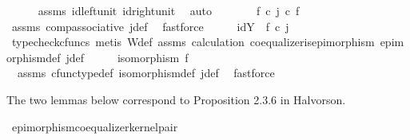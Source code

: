 \begin{isabellebody}
\ \ \ \ \isamarkupfalse%
\ assms{\isacharparenleft}{\kern0pt}{}{\isacharparenright}{\kern0pt}\ id{\isacharunderscore}{\kern0pt}left{\isacharunderscore}{\kern0pt}unit{}\ id{\isacharunderscore}{\kern0pt}right{\isacharunderscore}{\kern0pt}unit{}\ \isamarkupfalse%
\ auto\isanewline
\ \ \isamarkupfalse%
\ \isamarkupfalse%
\ {\isachardoublequoteopen}{\isachardot}{\kern0pt}{\isachardot}{\kern0pt}{\isachardot}{\kern0pt}\ {\isacharequal}{\kern0pt}\ {\isacharparenleft}{\kern0pt}f\ {\isasymcirc}\isactrlsub c\ j{\isacharparenright}{\kern0pt}\ {\isasymcirc}\isactrlsub c\ f{\isachardoublequoteclose}\isanewline
\ \ \ \ \ \isamarkupfalse%
\ assms{\isacharparenleft}{\kern0pt}{}{\isacharparenright}{\kern0pt}\ comp{\isacharunderscore}{\kern0pt}associative{}\ j{\isacharunderscore}{\kern0pt}def\ \isamarkupfalse%
\ fastforce\isanewline
\ \ \isamarkupfalse%
\ \isamarkupfalse%
\ {\isachardoublequoteopen}id{\isacharparenleft}{\kern0pt}Y{\isacharparenright}{\kern0pt}\ {\isacharequal}{\kern0pt}\ f\ {\isasymcirc}\isactrlsub c\ j{\isachardoublequoteclose}\isanewline
\ \ \ \ \isamarkupfalse%
\ {\isacharparenleft}{\kern0pt}typecheck{\isacharunderscore}{\kern0pt}cfuncs{\isacharcomma}{\kern0pt}\ metis\ W{\isacharunderscore}{\kern0pt}def\ assms{\isacharparenleft}{\kern0pt}{}{\isacharparenright}{\kern0pt}\ calculation\ coequalizer{\isacharunderscore}{\kern0pt}is{\isacharunderscore}{\kern0pt}epimorphism\ epimorphism{\isacharunderscore}{\kern0pt}def{}\ j{\isacharunderscore}{\kern0pt}def{\isacharparenright}{\kern0pt}\isanewline
\ \ \isamarkupfalse%
\ \isamarkupfalse%
\ {\isachardoublequoteopen}isomorphism\ f{\isachardoublequoteclose}\isanewline
\ \ \ \ \isamarkupfalse%
\ \ assms{\isacharparenleft}{\kern0pt}{}{\isacharparenright}{\kern0pt}\ cfunc{\isacharunderscore}{\kern0pt}type{\isacharunderscore}{\kern0pt}def\ isomorphism{\isacharunderscore}{\kern0pt}def\ j{\isacharunderscore}{\kern0pt}def\ \isamarkupfalse%
\ fastforce\ \ \isanewline
{}\isamarkupfalse%
%
\endisatagproof
{\isafoldproof}%
%
\isadelimproof
%
\endisadelimproof
%
\begin{isamarkuptext}%
The two lemmas below correspond to Proposition 2.3.6 in Halvorson.%
\end{isamarkuptext}\isamarkuptrue%
\isamarkupfalse%
\ epimorphism{\isacharunderscore}{\kern0pt}coequalizer{\isacharunderscore}{\kern0pt}kernel{\isacharunderscore}{\kern0pt}pair{\isacharcolon}{\kern0pt}\isanewline

\end{isabellebody}
